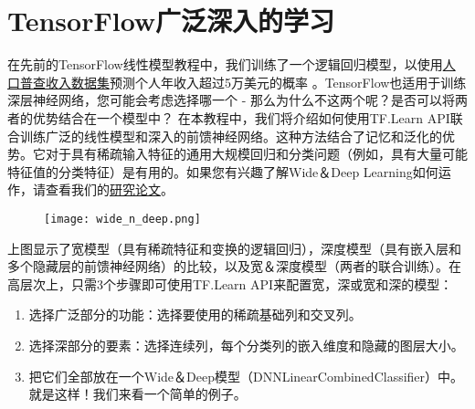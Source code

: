 \section{TensorFlow广泛深入的学习}
在先前的TensorFlow线性模型教程中，我们训练了一个逻辑回归模型，以使用\href{https://archive.ics.uci.edu/ml/datasets/Census+Income}{人口普查收入数据集}预测个人年收入超过5万美元的概率 。TensorFlow也适用于训练深层神经网络，您可能会考虑选择哪一个 - 那么为什么不这两个呢？是否可以将两者的优势结合在一个模型中？
在本教程中，我们将介绍如何使用TF.Learn API联合训练广泛的线性模型和深入的前馈神经网络。这种方法结合了记忆和泛化的优势。它对于具有稀疏输入特征的通用大规模回归和分类问题（例如，具有大量可能特征值的分类特征）是有用的。如果您有兴趣了解Wide＆Deep Learning如何运作，请查看我们的\href{http://arxiv.org/abs/1606.07792}{研究论文}。
\begin{figure}[H]
	\texttt{[image: wide\_n\_deep.png]}
\end{figure}
上图显示了宽模型（具有稀疏特征和变换的逻辑回归），深度模型（具有嵌入层和多个隐藏层的前馈神经网络）的比较，以及宽＆深度模型（两者的联合训练）。在高层次上，只需3个步骤即可使用TF.Learn API来配置宽，深或宽和深的模型：
\begin{enumerate}
\item 选择广泛部分的功能：选择要使用的稀疏基础列和交叉列。
\item 选择深部分的要素：选择连续列，每个分类列的嵌入维度和隐藏的图层大小。
\item 把它们全部放在一个Wide＆Deep模型（DNNLinearCombinedClassifier）中。
就是这样！我们来看一个简单的例子。
\end{enumerate}

